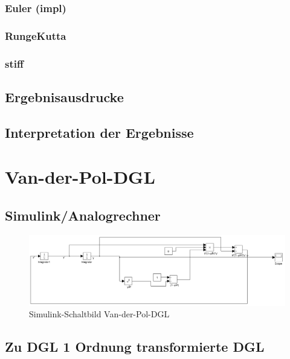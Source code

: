 \documentclass[10pt]{scrartcl}
\begin{document}
		\subsubsection{Euler (impl)}
				
		
		\subsubsection{Runge\-Kutta}
				
		
		\subsubsection{stiff}		
		
	\subsection{Ergebnisausdrucke}	
		
	\subsection{Interpretation der Ergebnisse}		
		

\section{Van-der-Pol-DGL}
	\subsection{Simulink/Analogrechner}
	\begin{figure}[htbp]
	\centering
		\includegraphics[scale=0.4]{aufg2_a_simulink}
	\caption{Simulink-Schaltbild Van-der-Pol-DGL}
	\label{fig:simulinkAufg2}
	\end{figure}	
	
	\subsection{Zu DGL 1 Ordnung transformierte DGL}
	
\end{document}
